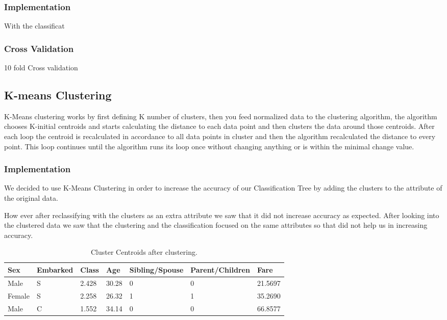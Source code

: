 \documentclass[a4paper,11pt]{article}
\begin{document}
\subsubsection{Implementation}
With the classificat 
\subsubsection{Cross Validation}
10 fold Cross validation
\subsection{K-means Clustering}
K-Means clustering\cite[p.451]{DataMinBook} works by first defining K number of clusters, then you feed normalized data to the clustering algorithm, the algorithm chooses K-initial centroids and starts calculating the distance to each data point and then clusters the data around those centroids. After each loop the centroid is recalculated in accordance to all data points in cluster and then the algorithm recalculated the distance to every point. This loop continues until the algorithm runs its loop once without changing anything or is within the minimal change value.
\subsubsection{Implementation}
We decided to use K-Means Clustering in order to increase the accuracy of our Classification Tree by adding the clusters to the attribute of the original data.

How ever after reclassifying with the clusters as an extra attribute we saw that it did not increase accuracy as expected. After looking into the clustered data we saw that the clustering and the classification focused on the same attributes so that did not help us in increasing accuracy.

\begin{table}[h]
\begin{tabular}{|l|l|l|l|l|l|l|}
\hline
Sex & Embarked & Class & Age & Sibling/Spouse & Parent/Children & Fare\\
\hline
Male & S & 2.428 & 30.28 & 0 & 0 & 21.5697\\
Female & S & 2.258 & 26.32 & 1 & 1 & 35.2690\\
Male & C & 1.552 & 34.14 & 0 & 0 & 66.8577\\
\hline
\end{tabular}
\caption{Cluster Centroids after clustering.}
\label{clusterCentroids}
\end{table}
\end{document}
